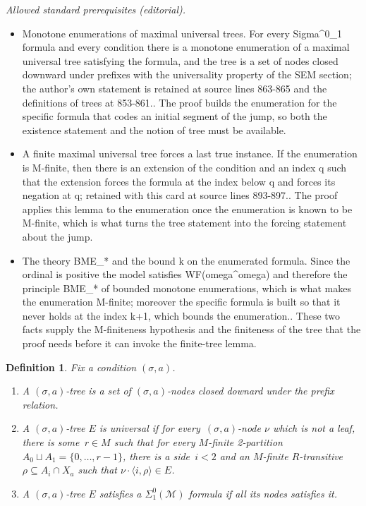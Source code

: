 \documentclass{article}
\numberwithin{theorem}{section}
\newtheorem{definition}[theorem]{Definition}
\newcommand{\M}{\mathcal{M}}
\begin{document}
\noindent\textit{Allowed standard prerequisites (editorial).}\begin{itemize}
\item Monotone enumerations of maximal universal trees. For every Sigma\textasciicircum{}0\_1 formula and every condition there is a monotone enumeration of a maximal universal tree satisfying the formula, and the tree is a set of nodes closed downward under prefixes with the universality property of the SEM section; the author's own statement is retained at source lines 863-865 and the definitions of trees at 853-861.. The proof builds the enumeration for the specific formula that codes an initial segment of the jump, so both the existence statement and the notion of tree must be available.
\item A finite maximal universal tree forces a last true instance. If the enumeration is M-finite, then there is an extension of the condition and an index q such that the extension forces the formula at the index below q and forces its negation at q; retained with this card at source lines 893-897.. The proof applies this lemma to the enumeration once the enumeration is known to be M-finite, which is what turns the tree statement into the forcing statement about the jump.
\item The theory BME\_* and the bound k on the enumerated formula. Since the ordinal is positive the model satisfies WF(omega\textasciicircum{}omega) and therefore the principle BME\_* of bounded monotone enumerations, which is what makes the enumeration M-finite; moreover the specific formula is built so that it never holds at the index k+1, which bounds the enumeration.. These two facts supply the M-finiteness hypothesis and the finiteness of the tree that the proof needs before it can invoke the finite-tree lemma.
\end{itemize}\medskip
\begin{definition}
Fix a condition $(\sigma, a)$.
\begin{enumerate}
    \item[(1)] A \emph{$(\sigma, a)$-tree} is a set of $(\sigma, a)$-nodes closed downard under the prefix relation.
    \item[(2)] A $(\sigma, a)$-tree $E$ is \emph{universal} if for every~$(\sigma,a)$-node $\nu$
    which is not a leaf, there is some~$r \in M$ such that for every $M$-finite 2-partition $A_0 \sqcup A_1 = \{0, \dots, r-1\}$, there is a side~$i < 2$ and an $M$-finite $R$-transitive $\rho \subseteq A_i \cap X_a$ such that $\nu \cdot \langle i, \rho \rangle \in E$.
    \item[(3)] A $(\sigma, a)$-tree $E$ satisfies a $\Sigma^0_1(\M)$ formula if all its nodes satisfies it.
\end{enumerate}
\end{definition}
\end{document}
